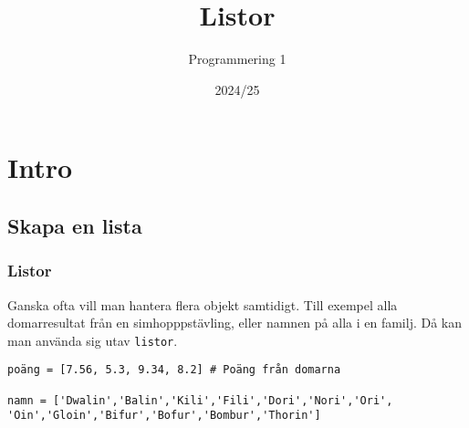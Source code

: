 \documentclass[aspectratio=169]{beamer}
\begin{document}


\title{Listor}
\date{2024/25}
\author{Programmering 1}

\maketitle

\section{Intro}

\subsection{Skapa en lista}

\begin{frame}[fragile]
	\frametitle{Listor}
	
	Ganska ofta vill man hantera flera objekt samtidigt. Till exempel alla domarresultat från en simhopppstävling, eller namnen på alla i en familj. Då kan man använda sig utav \texttt{listor}.
	
	\begin{lstlisting}
poäng = [7.56, 5.3, 9.34, 8.2] # Poäng från domarna

namn = ['Dwalin','Balin','Kili','Fili','Dori','Nori','Ori',    'Oin','Gloin','Bifur','Bofur','Bombur','Thorin']
	\end{lstlisting}
\end{frame}
\end{document}
